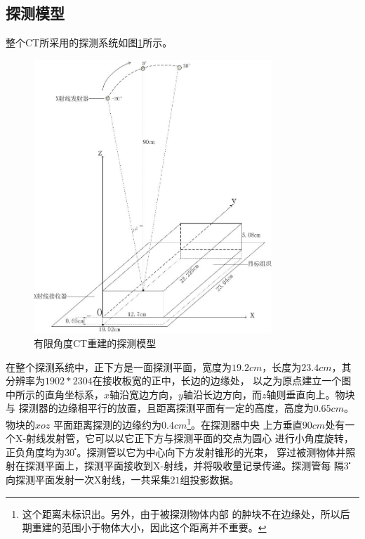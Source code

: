 \subsection{探测模型}
整个CT所采用的探测系统如图\ref{fig:model1}所示。
\begin{figure}[h]
\center
\includegraphics[width=0.8\textwidth]{figure/model1}
\caption{有限角度CT重建的探测模型}\label{fig:model1}
\end{figure}
在整个探测系统中，正下方是一面探测平面，宽度为$19.2cm$，长度为$23.4cm$，其分辨率为$1902*2304$在接收板宽的正中，长边的边缘处，
以之为原点建立一个图中所示的直角坐标系，$x$轴沿宽边方向，$y$轴沿长边方向，而$z$轴则垂直向上。物块与
探测器的边缘相平行的放置，且距离探测平面有一定的高度，高度为$0.65cm$。物块的$xoz$
平面距离探测的边缘约为$0.4cm$\footnote{这个距离未标识出。另外，由于被探测物体内部
的肿块不在边缘处，所以后期重建的范围小于物体大小，因此这个距离并不重要。}。在探测器中央
上方垂直$90cm$处有一个X-射线发射管，它可以以它正下方与探测平面的交点为圆心
进行小角度旋转，正负角度均为$30^\centerdot$。探测管以它为中心向下方发射锥形的光束，
穿过被测物体并照射在探测平面上，探测平面接收到X-射线，并将吸收量记录传递。探测管每
隔$3^\centerdot$向探测平面发射一次X射线，一共采集$21$组投影数据。

